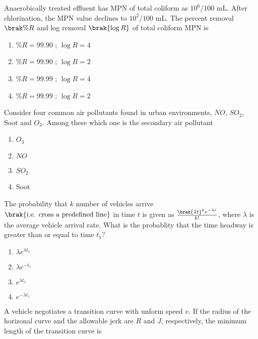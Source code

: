     \item Anaerobically treated effluent has MPN of total coliform as $10^6/100$ mL. After chlorination, the MPN value declines to $10^2/100$ mL. The percent removal $\brak{\%R}$ and log removal $\brak{\log R}$ of total coliform MPN is
	\hfill{}

	\begin{enumerate}
		\item $\%R = 99.90$ ; $\log R = 4$
		\item $\%R = 99.90$ ; $\log R = 2$
		\item $\%R = 99.99$ ; $\log R = 4$
		\item $\%R = 99.99$ ; $\log R = 2$
	\end{enumerate}


    \item Consider four common air pollutants found in urban environments, $NO$, $SO_2$, Soot and $O_3$. Among these which one is the secondary air pollutant
	\hfill{}
	
	\begin{enumerate}
		\item $O_3$
		\item $NO$
		\item $SO_2$
		\item Soot
	\end{enumerate}


    \item The probability that $k$ number of vehicles arrive $\brak{\text{i.e. cross a predefined line}}$ in time $t$ is given as $\frac{\brak{\lambda t}^k e^{-\lambda t}}{k!}$, where $\lambda$ is the average vehicle arrival rate. What is the probablity that the time headway is greater than or equal to time $t_1$?
	\hfill{}

	\begin{enumerate}
		\item $\lambda e^{\lambda t_1}$
		\item $\lambda e^{-t_1}$
		\item $e^{\lambda t_1}$
		\item $e^{-\lambda t_1}$
	\end{enumerate}


    \item A vehicle negotiates a transition curve with unform speed $v$. If the radius of the horizonal curve and the allowable jerk are $R$ and $J$, respectively, the minimum length of the transition curve is
	\hfill{}


